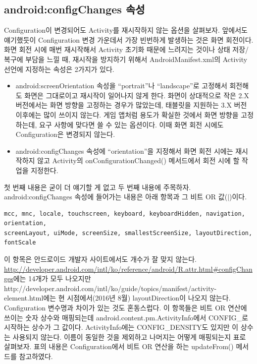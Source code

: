 \subsection{android:configChanges 속성}
Configuration이 변경되어도 Activity를 재시작하지 않는 옵션을 살펴보자.
앞에서도 얘기했듯이 Configuration 변경 가운데서 가장 빈번하게 발생하는 것은 화면 회전이다.
화면 회전 시에 매번 재시작해서 Activity 초기화 때문에 느려지는 것이나 상태 저장/복구에 부담을 느낄 때, 재시작을 방지하기 위해서 AndroidManifest.xml의 Activity 선언에 지정하는 속성은 2가지가 있다.
\begin{itemize}
\item android:screenOrientation 속성을 ``portrait''나 ``landscape''로 고정해서 회전해도 화면은 그대로이고 재시작이 일어나지 않게 한다. 
화면이 상대적으로 작은 2.X 버전에서는 화면 방향을 고정하는 경우가 많았는데, 태블릿을 지원하는 3.X 버전 이후에는 많이 쓰이지 않는다. 
게임 앱처럼 용도가 확실한 것에서 화면 방향을 고정하는데, 요구 사항에 맞다면 쓸 수 있는 옵션이다. 이때 화면 회전 시에도 Configuration은 변경되지 않는다.
\item android:configChanges 속성에 ``orientation''을 지정해서 화면 회전 시에는 재시작하지 않고 Activity의 onConfigurationChanged() 메서드에서 회전 시에 할 작업을 지정한다.
\end{itemize}

첫 번째 내용은 굳이 더 얘기할 게 없고 두 번째 내용에 주목하자.
android:configChanges 속성에 들어가는 내용은 아래 항목과 그 비트 OR 값($|$)이다.
\begin{lstlisting}[frame=single]
mcc, mnc, locale, touchscreen, keyboard, keyboardHidden, navigation, orientation, 
screenLayout, uiMode, screenSize, smallestScreenSize, layoutDirection, fontScale
\end{lstlisting}

이 항목은 안드로이드 개발자 사이트에서도 개수가 잘 맞지 않는다. \url{http://developer.android.com/intl/ko/reference/android/R.attr.html\#configChanges}에는 14개가 모두 나오지만 http://developer.android.com/intl/ko/guide/topics/manifest/activity-element.\-html에는 현 시점에서(2016년 8월) layoutDirection이 나오지 않는다.\\

Configuration 변수명과 차이가 있는 것도 혼동스럽다. 이 항목들은 비트 OR 연산에 쓰이는 숫자 상수와 매핑되는데 android.content.pm.ActivityInfo에서 CONFIG\_로 시작하는 상수가 그 값이다.
ActivityInfo에는 CONFIG\_DENSITY도 있지만 이 상수는 사용되지 않는다.
이름이 동일한 것을 제외하고 나머지는 어떻게 매핑되는지 표로 살펴보자. 표의 내용은 Configuration에서 비트 OR 연산을 하는 updateFrom() 메서드를 참고하였다.\\

